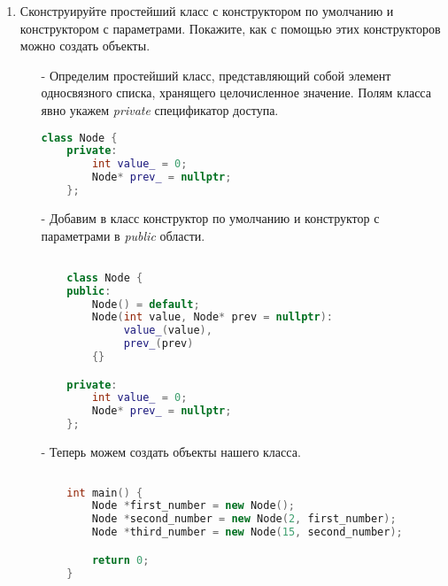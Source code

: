 \documentclass{article}
\begin{document}
\begin{enumerate}
\begin{itemize}
		\end{itemize}
	
	\item Сконструируйте простейший класс с конструктором по умолчанию и конструктором с параметрами. Покажите, как с помощью этих конструкторов можно создать объекты.

		\begin{itemize}
		
			\item[-] Определим простейший класс, представляющий собой элемент односвязного списка, хранящего целочисленное значение. Полям класса явно укажем \emph{private} спецификатор доступа.
				
				\begin{lstlisting}[language=C++]
    class Node {		
    private:
        int value_ = 0;
        Node* prev_ = nullptr;
    };
				\end{lstlisting}
	
			\item[-] Добавим в класс конструктор по умолчанию и конструктор с параметрами в \emph{public} области.

				\begin{lstlisting}[language=C++]

    class Node {	
    public:
        Node() = default;
        Node(int value, Node* prev = nullptr):
             value_(value),
             prev_(prev)
        {}

    private:
        int value_ = 0;
        Node* prev_ = nullptr;
    };
				\end{lstlisting}
	
			\item[-] Теперь можем создать объекты нашего класса.

				\begin{lstlisting}[language=C++]
				
    int main() {
        Node *first_number = new Node();
        Node *second_number = new Node(2, first_number);
        Node *third_number = new Node(15, second_number);

        return 0;
    }
				\end{lstlisting}
	
		\end{itemize}
	
\end{enumerate}
\end{document}
